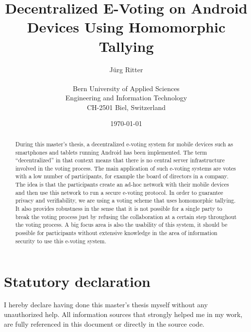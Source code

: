 \documentclass[numbers=noenddot, abstract=on, a4paper, headsepline,
footsepline, oneside, draft=off]{scrreprt}
\begin{document}
\title{\bf Decentralized E-Voting on Android Devices Using Homomorphic Tallying}
\subject{Master's Thesis}
\author{Jürg Ritter\\
\\
Bern University of Applied Sciences\\
Engineering and Information Technology\\
CH-2501 Biel, Switzerland\\
}
\date{\today}
\publishers{Advisor:\\
Prof. Dr. Rolf Haenni, Bern University of Applied Sciences\\
\bigskip
Expert:\\
Stephan Neumann, Technical University of Darmstadt}
\maketitle

\clearpage
{}

\begin{abstract}
During this master's thesis, a decentralized e-voting system for mobile devices
such as smartphones and tablets running Android has been implemented. The term
``decentralized'' in that context means that there is no central server
infrastructure involved in the voting process. The main application of such
e-voting systems are votes with a low number of participants, for example the
board of directors in a company. The idea is that the participants create an
ad-hoc network with their mobile devices and then use this network to run a
secure e-voting protocol. In order to guarantee privacy and verifiability, we are using
a voting scheme that uses homomorphic tallying. It also provides robustness in the sense
that it is not possible for a single party to break the voting process just by
refusing the collaboration at a certain step throughout the voting process. A
big focus area is also the usability of this system, it should be possible for
participants without extensive knowledge in the area of information security to
use this e-voting system.
\end{abstract}

\chapter*{Statutory declaration}
\label{chap:decalration}

I hereby declare having done this master's thesis myself without any
unauthorized help. All information sources that strongly helped me in my work,
are fully referenced in this document or directly in the source code.
\end{document}
